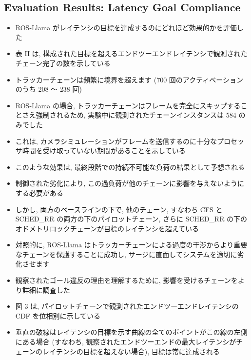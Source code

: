 \subsection{Evaluation Results: Latency Goal Compliance}
\label{ssec: evaluation results: latency goal compliance}

\begin{frame}{}
    \begin{itemize}
        \item ROS-Llama がレイテンシの目標を達成するのにどれほど効果的かを評価した
\item 表 II は, 構成された目標を超えるエンドツーエンドレイテンシで観測されたチェーン完了の数を示している
    \end{itemize}
\end{frame}

\begin{frame}{}
    \begin{itemize}
        \item トラッカーチェーンは頻繁に境界を超えます (700 回のアクティベーションのうち 208 ～ 238 回)
\item ROS-Llama の場合, トラッカーチェーンはフレームを完全にスキップすることさえ強制されるため, 実験中に観測されたチェーンインスタンスは 584 のみでした
\item これは, カメラシミュレーションがフレームを送信するのに十分なプロセッサ時間を受け取っていない期間があることを示している
    \end{itemize}
\end{frame}

\begin{frame}{}
    \begin{itemize}
        \item このような効果は, 最終段階での持続不可能な負荷の結果として予想される
\item 制御された劣化により, この過負荷が他のチェーンに影響を与えないようにする必要がある
\item しかし, 両方のベースラインの下で, 他のチェーン, すなわち CFS と SCHED\_RR の両方の下のパイロットチェーン, さらに SCHED\_RR の下のオドメトリロックチェーンが目標のレイテンシを超えている
\item 対照的に, ROS-Llama はトラッカーチェーンによる過度の干渉からより重要なチェーンを保護することに成功し, サージに直面してシステムを適切に劣化させます
    \end{itemize}
\end{frame}

\begin{frame}{}
    \begin{itemize}
        \item 観察されたゴール違反の理由を理解するために, 影響を受けるチェーンをより詳細に調査した
\item 図 3 は, パイロットチェーンで観測されたエンドツーエンドレイテンシの CDF を位相別に示している
\item 垂直の破線はレイテンシの目標を示す曲線の全てのポイントがこの線の左側にある場合 (すなわち, 観察されたエンドツーエンドの最大レイテンシがチェーンのレイテンシの目標を超えない場合), 目標は常に達成される
    \end{itemize}
\end{frame}

